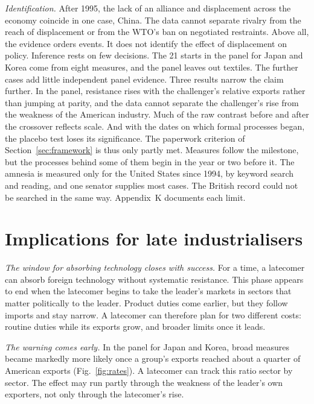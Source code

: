\documentclass[review,authoryear,12pt]{elsarticle}
\begin{document}
\emph{Identification.} After 1995, the lack of an alliance and displacement across the economy coincide in one case, China. The data cannot separate rivalry from the reach of displacement or from the WTO's ban on negotiated restraints. Above all, the evidence orders events. It does not identify the effect of displacement on policy. Inference rests on few decisions. The 21 starts in the panel for Japan and Korea come from eight measures, and the panel leaves out textiles. The further cases add little independent panel evidence. Three results narrow the claim further. In the panel, resistance rises with the challenger's relative exports rather than jumping at parity, and the data cannot separate the challenger's rise from the weakness of the American industry. Much of the raw contrast before and after the crossover reflects scale. And with the dates on which formal processes began, the placebo test loses its significance. The paperwork criterion of Section~\ref{sec:framework} is thus only partly met. Measures follow the milestone, but the processes behind some of them begin in the year or two before it. The amnesia is measured only for the United States since 1994, by keyword search and reading, and one senator supplies most cases. The British record could not be searched in the same way. Appendix~K documents each limit.

\section{Implications for late industrialisers}\label{sec:discussion}

\emph{The window for absorbing technology closes with success.} For a time, a latecomer can absorb foreign technology without systematic resistance. This phase appears to end when the latecomer begins to take the leader's markets in sectors that matter politically to the leader. Product duties come earlier, but they follow imports and stay narrow. A latecomer can therefore plan for two different costs: routine duties while its exports grow, and broader limits once it leads.

\emph{The warning comes early.} In the panel for Japan and Korea, broad measures became markedly more likely once a group's exports reached about a quarter of American exports (Fig.~\ref{fig:rates}). A latecomer can track this ratio sector by sector. The effect may run partly through the weakness of the leader's own exporters, not only through the latecomer's rise.
\end{document}
